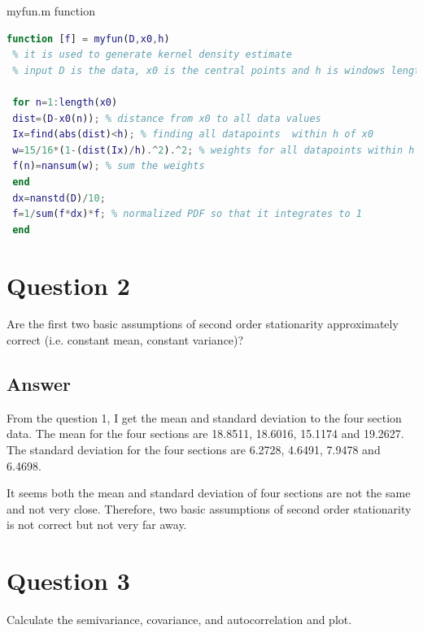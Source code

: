 \documentclass[
	12pt, %
]{fphw}
\begin{document}
 myfun.m function
 \begin{lstlisting}[language=Matlab,escapeinside=``]
 function [f] = myfun(D,x0,h)
 % it is used to generate kernel density estimate
 % input D is the data, x0 is the central points and h is windows length

 for n=1:length(x0)
 dist=(D-x0(n)); % distance from x0 to all data values
 Ix=find(abs(dist)<h); % finding all datapoints  within h of x0
 w=15/16*(1-(dist(Ix)/h).^2).^2; % weights for all datapoints within h of x0
 f(n)=nansum(w); % sum the weights
 end
 dx=nanstd(D)/10;
 f=1/sum(f*dx)*f; % normalized PDF so that it integrates to 1
 end
\end{lstlisting}

\section*{Question 2}

\begin{problem}
Are the first two basic assumptions of second order stationarity approximately correct (i.e.
constant mean, constant variance)?
	
\end{problem}


\subsection*{Answer}

From the question 1, I get the mean and standard deviation to the four section data. The mean for the four sections are 18.8511, 18.6016, 15.1174 and 19.2627. The standard deviation for the four sections are 6.2728, 4.6491, 7.9478 and 6.4698. 

It seems both the mean and standard deviation of four sections are not the same and not very close. Therefore, two basic assumptions of second order stationarity is not correct but not very far away.


\section*{Question 3}

\begin{problem}
Calculate the semivariance, covariance, and autocorrelation and plot.
\end{problem}
\end{document}
